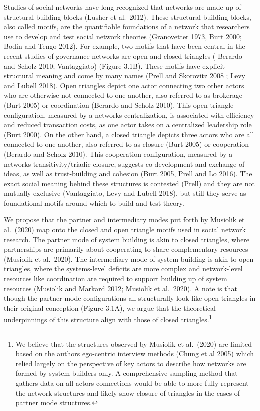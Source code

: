 \documentclass[twoside,12pt,final]{ucthesis-CA2012}
\begin{document}
\begin{ucmainmatter}
Studies of social networks have long recognized that networks are made
up of structural building blocks (Lusher et al.~2012). These structural
building blocks, also called motifs, are the quantifiable foundations of
a network that researchers use to develop and test social network
theories (Granovetter 1973, Burt 2000; Bodin and Tengo 2012). For
example, two motifs that have been central in the recent studies of
governance networks are open and closed triangles ( Berardo and Scholz
2010; Vantaggiato) (Figure 3.1B). These motifs have explicit structural
meaning and come by many names (Prell and Skorovitz 2008 ; Levy and
Lubell 2018). Open triangles depict one actor connecting two other
actors who are otherwise not connected to one another, also referred to
as brokerage (Burt 2005) or coordination (Berardo and Scholz 2010). This
open triangle configuration, measured by a network\textquotesingle s
\textquotesingle centralization\textquotesingle, is associated with efficiency and reduced
transaction costs, as one actor takes on a centralized leadership role
(Burt 2000). On the other hand, a closed triangle depicts three actors
who are all connected to one another, also referred to as closure (Burt
2005) or cooperation (Berardo and Scholz 2010). This cooperation
configuration, measured by a network\textquotesingle s \textquotesingle transitivity\textquotesingle/\textquotesingle triadic
closure\textquotesingle, suggests co-development and exchange of ideas, as well as
trust-building and cohesion (Burt 2005, Prell and Lo 2016). The exact
social meaning behind these structures is contested (Prell) and they are
not mutually exclusive (Vantaggiato, Levy and Lubell 2018), but still
they serve as foundational motifs around which to build and test theory.

We propose that the partner and intermediary modes put forth by Musiolik
et al.~(2020) map onto the closed and open triangle motifs used in
social network research. The partner mode of system building is akin to
closed triangles, where partnerships are primarily about cooperating to
share complementary resources (Musiolik et al.~2020). The intermediary
mode of system building is akin to open triangles, where the
systems-level deficits are more complex and network-level resources like
coordination are required to support building up of system resources
(Musiolik and Markard 2012; Musiolik et al.~2020). A note is that though
the partner mode configurations all structurally look like open
triangles in their original conception (Figure 3.1A), we argue that the
theoretical underpinnings of this structure align with those of closed
triangles.\footnote{We believe that the structures observed by Musiolik et al.~(2020)
  are limited based on the authors\textquotesingle{} \textquotesingle ego-centric\textquotesingle{} interview methods
  (Chung et al 2005) which relied largely on the perspective of key
  actors to describe how networks are formed by system builders only.
  A comprehensive sampling method that gathers data on all actors\textquotesingle{}
  connections would be able to more fully represent the network
  structures and likely show \textquotesingle closure\textquotesingle{} of triangles in the cases of
  partner mode structures.}


\end{ucmainmatter}
\end{document}
